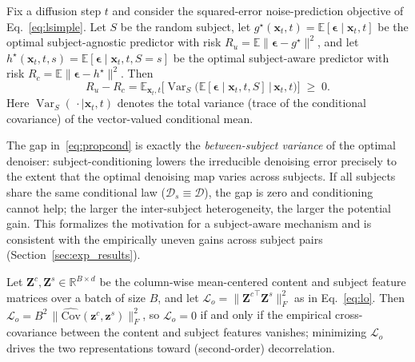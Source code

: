 \begin{proposition}
\label{prop:cond}
Fix a diffusion step $t$ and consider the squared-error noise-prediction
objective of Eq.~\eqref{eq:lsimple}. Let $S$ be the random subject, let
$g^\star(\mathbf{x}_t,t)=\mathbb{E}[\boldsymbol{\epsilon}\mid\mathbf{x}_t,t]$ be
the optimal subject-agnostic predictor with risk $R_u=\mathbb{E}\|\boldsymbol{\epsilon}-g^\star\|^2$,
and let $h^\star(\mathbf{x}_t,t,s)=\mathbb{E}[\boldsymbol{\epsilon}\mid\mathbf{x}_t,t,S{=}s]$
be the optimal subject-aware predictor with risk
$R_c=\mathbb{E}\|\boldsymbol{\epsilon}-h^\star\|^2$. Then
\begin{equation}
  R_u-R_c=\mathbb{E}_{\mathbf{x}_t,t}\!\big[\operatorname{Var}_{S}\!\big(\mathbb{E}[\boldsymbol{\epsilon}\mid\mathbf{x}_t,t,S]\,\big|\,\mathbf{x}_t,t\big)\big]\;\ge\;0.
  \label{eq:propcond}
\end{equation}
Here $\operatorname{Var}_S(\,\cdot\mid\mathbf{x}_t,t)$ denotes the total variance
(trace of the conditional covariance) of the vector-valued conditional mean.
\end{proposition}

The gap in~\eqref{eq:propcond} is exactly the \emph{between-subject variance} of
the optimal denoiser: subject-conditioning lowers the irreducible denoising error
precisely to the extent that the optimal denoising map varies across subjects. If
all subjects share the same conditional law ($\mathcal{D}_s\equiv\mathcal{D}$),
the gap is zero and conditioning cannot help; the larger the inter-subject
heterogeneity, the larger the potential gain. This formalizes the motivation for
a subject-aware mechanism and is consistent with the empirically uneven gains
across subject pairs (Section~\ref{sec:exp_results}).



\begin{proposition}
\label{prop:orth}
Let $\mathbf{Z}^{c},\mathbf{Z}^{s}\in\mathbb{R}^{B\times d}$ be the column-wise
mean-centered content and subject feature matrices over a batch of size $B$, and
let $\mathcal{L}_o=\|{\mathbf{Z}^{c}}^{\!\top}\mathbf{Z}^{s}\|_F^2$ as in
Eq.~\eqref{eq:lo}. Then
$\mathcal{L}_o=B^2\,\|\widehat{\mathrm{Cov}}(\mathbf{z}^{c},\mathbf{z}^{s})\|_F^2$,
so $\mathcal{L}_o=0$ if and only if the empirical cross-covariance between the
content and subject features vanishes; minimizing $\mathcal{L}_o$ drives the two
representations toward (second-order) decorrelation.
\end{proposition}

